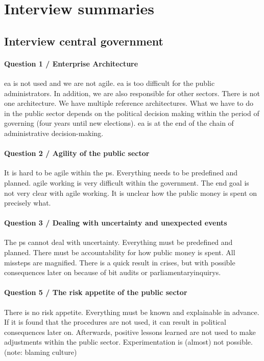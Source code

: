 \chapter{Interview summaries}
\label{app:interviewsummaries}
\section{Interview central government}
\label{sec:interviewcentralgovernment}
\subsubsection{Question 1 / Enterprise Architecture}
\acrshort{ea} is not used and we are not \gls{agile}. \acrshort{ea} is too difficult for the public administrators. In addition, we are also responsible for other sectors. There is not one architecture. We have multiple reference architectures. What we have to do in the public sector depends on the political decision making within the period of governing (four years until new elections). \acrshort{ea} is at the end of the chain of administrative decision-making.
\subsubsection{Question 2 / Agility of the public sector}
It is hard to be \gls{agile} within the \gls{ps}. Everything needs to be predefined and planned. \Gls{agile} working is very difficult within the government. The end goal is not very clear with \gls{agile} working. It is unclear how the public money is spent on precisely what. 
\subsubsection{Question 3 / Dealing with uncertainty and unexpected events}
The \gls{ps} cannot deal with \gls{uncertainty}. Everything must be predefined and planned. There must be accountability for how public money is spent. All missteps are magnified. There is a quick result in crises, but with possible consequences later on because of \acrfull{bit} audits or \glspl{parliamentaryinquiry}.
\subsubsection{Question 5 / The risk appetite of the public sector}
There is no risk appetite. Everything must be known and explainable in advance. If it is found that the procedures are not used, it can result in political consequences later on. Afterwards, positive lessons learned are not used to make adjustments within the public sector. Experimentation is (almost) not possible.
(note: blaming culture)
